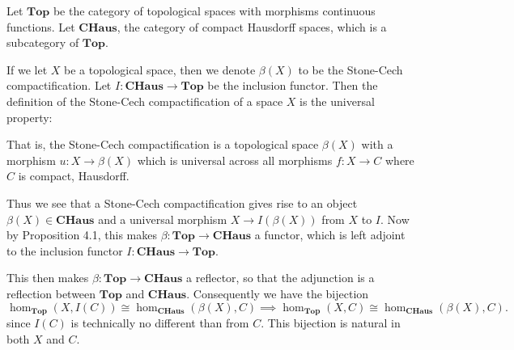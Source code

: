     \begin{example}
        Let $\textbf{Top}$ be the category of topological spaces with
        morphisms continuous functions. Let $\textbf{CHaus}$, the
        category of compact Hausdorff spaces, which is a subcategory
        of $\textbf{Top}$. 

        If we let $X$ be a topological space, then we denote
        $\beta(X)$ to be the Stone-Cech compactification. Let $I :
        \textbf{CHaus} \to \textbf{Top}$ be the inclusion functor. 
        Then the definition of the Stone-Cech compactification of a space $X$ is the
        universal property: 
        \begin{center}
            \hspace{1cm}
        \end{center}
        That is, the Stone-Cech compactification is a topological
        space $\beta(X)$ with a morphism $u: X \to \beta(X)$ which is
        universal across all morphisms $f: X \to C$ where $C$ is
        compact, Hausdorff. 

        Thus we see that a Stone-Cech compactification gives
        rise to an object $\beta(X) \in \textbf{CHaus}$ and a
        universal morphism $X \to I(\beta(X))$ from $X$ to $I$. Now by
        Proposition 4.1, this makes $\beta : \textbf{Top} \to
        \textbf{CHaus}$ a functor, which is left adjoint to the
        inclusion functor $I: \textbf{CHaus} \to \textbf{Top}$. 

        This then makes $\beta: \textbf{Top} \to \textbf{CHaus}$ a
        reflector, so that the adjunction is a reflection between
        $\textbf{Top}$ and $\textbf{CHaus}$. Consequently we have the
        bijection 
        \[
            \hom_{\textbf{Top}}(X, I(C)) \cong \hom_{\textbf{CHaus}}(\beta(X), C)
            \implies 
            \hom_{\textbf{Top}}(X, C) \cong \hom_{\textbf{CHaus}}(\beta(X), C).
        \]
        since $I(C)$ is technically no different than from $C$. This
        bijection is natural in both $X$ and $C$. 
    \end{example}

